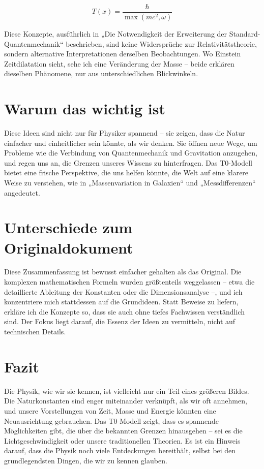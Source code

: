\documentclass[a4paper,12pt]{article}
\newcommand{\Tfield}{T(x)}
\begin{document}
	\begin{equation}
		\Tfield = \frac{\hbar}{\max(m c^2, \omega)}
	\end{equation}
	
	Diese Konzepte, ausführlich in „Die Notwendigkeit der Erweiterung der Standard-Quantenmechanik“ \cite{pascher_quantum_2025} beschrieben, sind keine Widersprüche zur Relativitätstheorie, sondern alternative Interpretationen derselben Beobachtungen. Wo Einstein Zeitdilatation sieht, sehe ich eine Veränderung der Masse – beide erklären dieselben Phänomene, nur aus unterschiedlichen Blickwinkeln.
	
	\section{Warum das wichtig ist}
	
	Diese Ideen sind nicht nur für Physiker spannend – sie zeigen, dass die Natur einfacher und einheitlicher sein könnte, als wir denken. Sie öffnen neue Wege, um Probleme wie die Verbindung von Quantenmechanik und Gravitation anzugehen, und regen uns an, die Grenzen unseres Wissens zu hinterfragen. Das T0-Modell bietet eine frische Perspektive, die uns helfen könnte, die Welt auf eine klarere Weise zu verstehen, wie in „Massenvariation in Galaxien“ \cite{pascher_galaxies_2025} und „Messdifferenzen“ \cite{pascher_messdifferenzen_2025} angedeutet.
	
	\section{Unterschiede zum Originaldokument}
	
	Diese Zusammenfassung ist bewusst einfacher gehalten als das Original. Die komplexen mathematischen Formeln wurden größtenteils weggelassen – etwa die detaillierte Ableitung der Konstanten oder die Dimensionsanalyse –, und ich konzentriere mich stattdessen auf die Grundideen. Statt Beweise zu liefern, erkläre ich die Konzepte so, dass sie auch ohne tiefes Fachwissen verständlich sind. Der Fokus liegt darauf, die Essenz der Ideen zu vermitteln, nicht auf technischen Details.
	
	\section{Fazit}
	
	Die Physik, wie wir sie kennen, ist vielleicht nur ein Teil eines größeren Bildes. Die Naturkonstanten sind enger miteinander verknüpft, als wir oft annehmen, und unsere Vorstellungen von Zeit, Masse und Energie könnten eine Neuausrichtung gebrauchen. Das T0-Modell zeigt, dass es spannende Möglichkeiten gibt, die über die bekannten Grenzen hinausgehen – sei es die Lichtgeschwindigkeit oder unsere traditionellen Theorien. Es ist ein Hinweis darauf, dass die Physik noch viele Entdeckungen bereithält, selbst bei den grundlegendsten Dingen, die wir zu kennen glauben.
	
\end{document}
